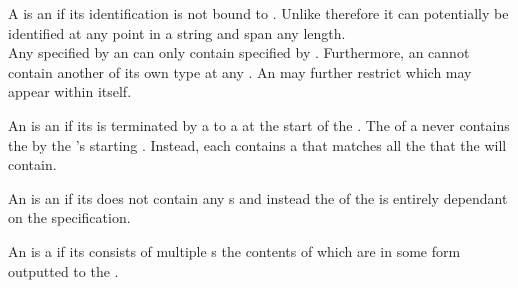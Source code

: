 A  is an  if its identification is not bound to . Unlike  therefore it can potentially be identified at any point in a string and span any length. \\

Any  specified by an  can only contain  specified by . Furthermore, an  cannot contain another  of its own type at any . An  may further restrict which  may appear within itself.

An  is an  if its  is terminated by a  to a  at the start of the . The  of a  never contains the   by the 's starting . Instead, each   contains a  that matches all the  that the  will contain.

An  is an  if its  does not contain any s and instead the  of the  is entirely dependant on the  specification.

An  is a  if its  consists of multiple s the contents of which are in some form outputted to the .







% 
% 
% 
% 
% 
% 
% 

